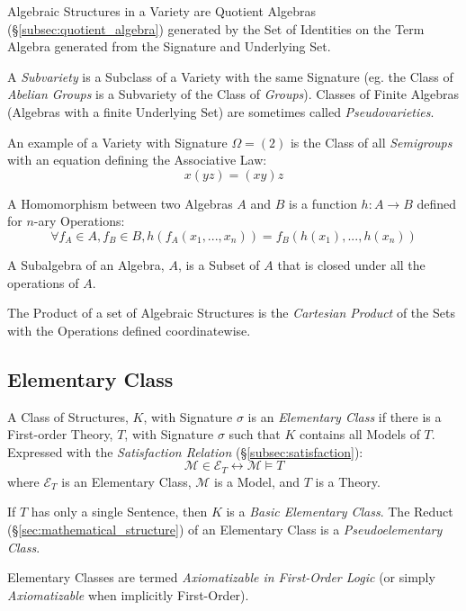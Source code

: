 \documentclass{article}
\begin{document}
Algebraic Structures in a Variety are Quotient Algebras
(\S\ref{subsec:quotient_algebra}) generated by the Set of Identities
on the Term Algebra generated from the Signature and Underlying Set.

A \emph{Subvariety} is a Subclass of a Variety with the same Signature
(eg. the Class of \emph{Abelian Groups} is a Subvariety of the Class
of \emph{Groups}). Classes of Finite Algebras (Algebras with a finite
Underlying Set) are sometimes called \emph{Pseudovarieties}.

An example of a Variety with Signature $\Omega = (2)$ is the Class of
all \emph{Semigroups} with an equation defining the Associative Law:
\[
    x(yz) = (xy)z
\]

A Homomorphism between two Algebras $A$ and $B$ is a function $h: A
\rightarrow B$ defined for $n$-ary Operations:
\[
\forall f_A \in A, f_B \in B, h(f_A(x_1, ..., x_n)) = f_B(h(x_1), ...,
h(x_n))
\]

A Subalgebra of an Algebra, $A$, is a Subset of $A$ that is closed
under all the operations of $A$.

The Product of a set of Algebraic Structures is the \emph{Cartesian
  Product} of the Sets with the Operations defined coordinatewise.

\subsection{Elementary Class}\label{subsec:elementary_class}

A Class of Structures, $K$, with Signature $\sigma$ is an
\emph{Elementary Class} if there is a First-order Theory, $T$, with
Signature $\sigma$ such that $K$ contains all Models of $T$.
Expressed with the \emph{Satisfaction Relation}
(\S\ref{subsec:satisfaction}):
\[
    \mathcal{M} \in \mathcal{E}_T \leftrightarrow \mathcal{M} \vDash T
\]
where $\mathcal{E}_T$ is an Elementary Class, $\mathcal{M}$ is a
Model, and $T$ is a Theory.

If $T$ has only a single Sentence, then $K$ is a \emph{Basic
  Elementary Class}. The Reduct (\S\ref{sec:mathematical_structure})
of an Elementary Class is a \emph{Pseudoelementary Class}.

Elementary Classes are termed \emph{Axiomatizable in First-Order
  Logic} (or simply \emph{Axiomatizable} when implicitly First-Order).
\end{document}
